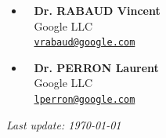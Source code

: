 \documentclass{resume}
\begin{document}
\begin{itemize}
\item \faGraduationCap~ \textbf{Dr. RABAUD Vincent}\\
\faBriefcase~ Google LLC \\
\faEnvelope~ \href{mailto:vrabaud@google.com}{\texttt{vrabaud@google.com}}\\

\item \faGraduationCap~ \textbf{Dr. PERRON Laurent}\\
\faBriefcase~ Google LLC \\
\faEnvelope~ \href{mailto:lperron@google.com}{\texttt{lperron@google.com}}\\
\end{itemize}

{\em Last update: \today}
\end{document}
